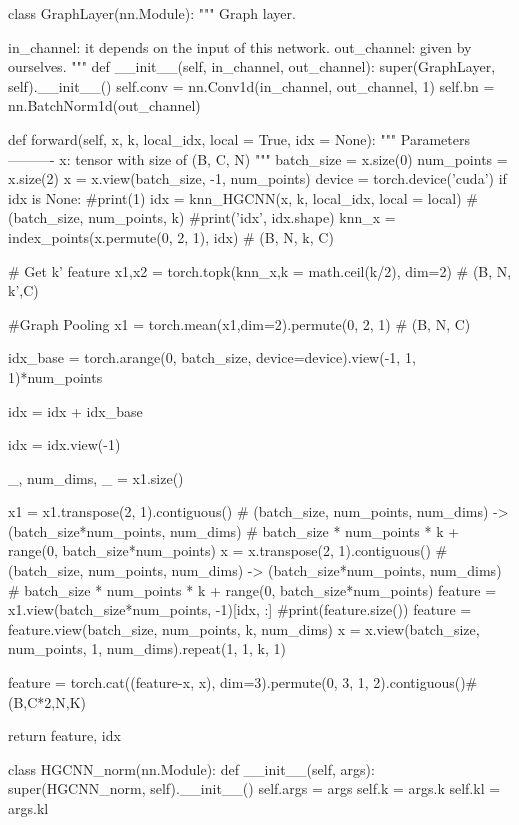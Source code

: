 class GraphLayer(nn.Module):
    """
    Graph layer.

    in_channel: it depends on the input of this network.
    out_channel: given by ourselves.
    """
    def __init__(self, in_channel, out_channel):
        super(GraphLayer, self).__init__()
        self.conv = nn.Conv1d(in_channel, out_channel, 1)
        self.bn = nn.BatchNorm1d(out_channel)

    def forward(self, x, k, local_idx, local = True, idx = None):
        """
        Parameters
        ----------
            x: tensor with size of (B, C, N)
        """
        batch_size = x.size(0)
        num_points = x.size(2)
        x = x.view(batch_size, -1, num_points)
        device = torch.device('cuda')
        if idx is None:
            #print(1)
            idx = knn_HGCNN(x, k, local_idx, local = local)   # (batch_size, num_points, k)
        #print('idx', idx.shape)
            knn_x = index_points(x.permute(0, 2, 1), idx)  # (B, N, k, C)

            # Get k' feature
            x1,x2 = torch.topk(knn_x,k = math.ceil(k/2), dim=2)  # (B, N, k',C)

            #Graph Pooling
            x1 = torch.mean(x1,dim=2).permute(0, 2, 1)  # (B, N, C)

            idx_base = torch.arange(0, batch_size, device=device).view(-1, 1, 1)*num_points

            idx = idx + idx_base

            idx = idx.view(-1)
 
        _, num_dims, _ = x1.size()

        x1 = x1.transpose(2, 1).contiguous()   # (batch_size, num_points, num_dims)  -> (batch_size*num_points, num_dims) #   batch_size * num_points * k + range(0, batch_size*num_points)
        x = x.transpose(2, 1).contiguous()   # (batch_size, num_points, num_dims)  -> (batch_size*num_points, num_dims) #   batch_size * num_points * k + range(0, batch_size*num_points)
        feature = x1.view(batch_size*num_points, -1)[idx, :]
        #print(feature.size())
        feature = feature.view(batch_size, num_points, k, num_dims)
        x = x.view(batch_size, num_points, 1, num_dims).repeat(1, 1, k, 1) 

        feature = torch.cat((feature-x, x), dim=3).permute(0, 3, 1, 2).contiguous()#(B,C*2,N,K)

        return feature, idx


class HGCNN_norm(nn.Module):
    def __init__(self, args):
        super(HGCNN_norm, self).__init__()
        self.args = args
        self.k = args.k
        self.kl = args.kl
        
